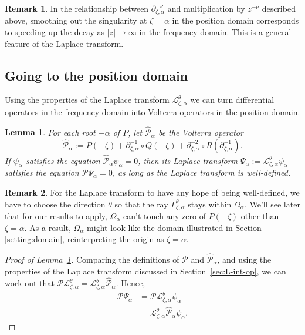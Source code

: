 \documentclass{article}
\theoremstyle{definition}
\newtheorem{rmk}{Remark}
\theoremstyle{plain}
\newtheorem{lemma}{Lemma}
\newcommand{\laplace}{\mathcal{L}}
\newcommand{\fracderiv}[3]{\partial^{#1}_{#2, #3}}
\newcommand{\domain}{\Omega}
\begin{document}
\begin{rmk}
In the relationship between $\fracderiv{-\nu}{\zeta}{\alpha}$ and multiplication by $z^{-\nu}$ described above, smoothing out the singularity at $\zeta = \alpha$ in the position domain corresponds to speeding up the decay as $|z| \to \infty$ in the frequency domain. This is a general feature of the Laplace transform.
\end{rmk}
\subsection{Going to the position domain}
Using the properties of the Laplace transform $\laplace_{\zeta,\alpha}^{\theta}$ we can turn differential operators in the frequency domain into Volterra operators in the position domain. 
\begin{lemma}\label{lem:use-dict}
For each root $-\alpha$ of $P$, let $\hat{\mathcal{P}}_{\alpha}$ be the Volterra operator 
\[ \hat{\mathcal{P}}_\alpha:=P(-\zeta)+\partial_{\zeta,\alpha}^{-1}\circ Q(-\zeta)+\partial_{\zeta,\alpha}^{-2}\circ R(\partial_{\zeta,\alpha}^{-1}). \]
If $\psi_\alpha$ satisfies the equation $\hat{\mathcal{P}}_\alpha\psi_\alpha=0$, then its Laplace transform $\Psi_\alpha:=\laplace_{\zeta,\alpha}^{\theta}\psi_\alpha$ satisfies the equation $\mathcal{P}\Psi_\alpha=0$, as long as the Laplace transform is well-defined.
\end{lemma}

\begin{rmk}
For the Laplace transform to have any hope of being well-defined, we have to choose the direction $\theta$ so that the ray $\Gamma_{\zeta, \alpha}^\theta$ stays within $\domain_\alpha$. We'll see later that for our results to apply, $\domain_\alpha$ can't touch any zero of $P(-\zeta)$ other than $\zeta = \alpha$. As a result, $\domain_\alpha$ might look like the domain illustrated in Section \ref{setting:domain}, reinterpreting the origin as $\zeta = \alpha$. 
\end{rmk}
\begin{proof}[Proof of Lemma~\ref{lem:use-dict}]
Comparing the definitions of $\mathcal{P}$ and $\hat{\mathcal{P}}_\alpha$, and using the properties of the Laplace transform discussed in Section~\ref{sec:L-int-op}, we can work out that $\mathcal{P} \laplace_{\zeta,\alpha}^\theta = \laplace_{\zeta,\alpha}^\theta \hat{\mathcal{P}}_\alpha$. Hence,
\begin{align*}
\mathcal{P}\Psi_\alpha & = \mathcal{P}\laplace_{\zeta,\alpha}^{\theta}\psi_\alpha \\
& = \laplace_{\zeta,\alpha}^{\theta}\hat{\mathcal{P}}_\alpha\psi_\alpha.
\end{align*}
\end{proof}
\end{document}
